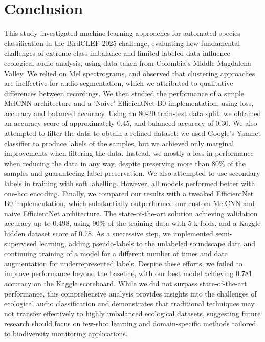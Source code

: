 \documentclass[10pt]{article}
\begin{document}
\section*{Conclusion}
This study investigated machine learning approaches for automated species classification in the BirdCLEF 2025 challenge, evaluating how fundamental challenges of extreme class imbalance and limited labeled data influence ecological audio analysis, using data taken from Colombia's Middle Magdalena Valley. We relied on Mel spectrograms, and observed that clustering approaches are ineffective for audio segmentation, which we attributed to qualitative differences between recordings. We then studied the performance of a simple MelCNN architecture and a 'Naive' EfficientNet B0 implementation, using loss, accuracy and balanced accuracy. Using an 80-20 train-test data split, we obtained an accuracy score of approximately 0.45, and balanced accuracy of 0.30. We also attempted to filter the data to obtain a refined dataset: we used Google's Yamnet classifier to produce labels of the samples, but we achieved only marginal improvements when filtering the data. Instead, we mostly a loss in performance when reducing the data in any way, despite preserving more than 80\% of the samples and guaranteeing label preservation. We also attempted to use secondary labels in training with soft labelling. However, all models performed better with one-hot encoding. Finally, we compared our results with a tweaked EfficientNet B0 implementation, which substantially outperformed our custom MelCNN and naive EfficientNet architecture. The state-of-the-art solution achieving validation accuracy up to 0.498, using 90\% of the training data with 5 k-folds, and a Kaggle hidden dataset score of 0.78. As a successive step, we implemented semi-supervised learning, adding pseudo-labels to the unlabeled soundscape data and continuing training of a model for a different number of times and data augmentation for underrepresented labels. Despite these efforts, we failed to improve performance beyond the baseline, with our best model achieving 0.781 accuracy on the Kaggle scoreboard. While we did not surpass state-of-the-art performance, this comprehensive analysis provides insights into the challenges of ecological audio classification and demonstrates that traditional techniques may not transfer effectively to highly imbalanced ecological datasets, suggesting future research should focus on few-shot learning and domain-specific methods tailored to biodiversity monitoring applications.
\end{document}
